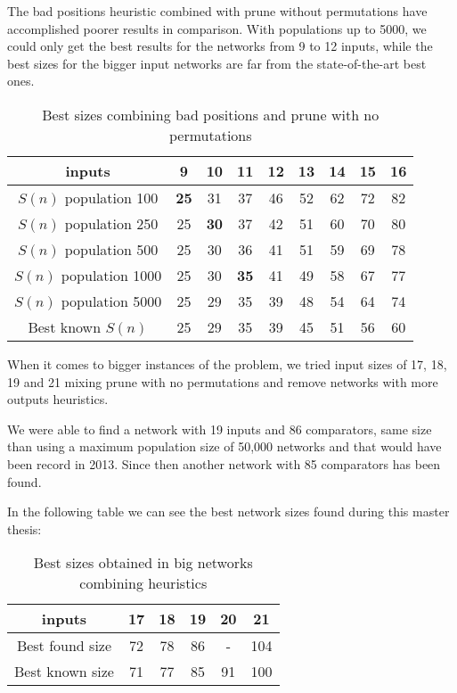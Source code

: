 \documentclass[../main.tex]{subfiles}
\begin{document}
	The bad positions heuristic combined with prune without permutations have accomplished poorer results in comparison. With populations up to 5000, we could only get the best results for the networks from 9 to 12 inputs, while the best sizes for the bigger input networks are far from the state-of-the-art best ones.
	\begin{table}[H]
		\begin{center}
				\begin{tabular}{|c | c c c c c c c c|} 
				\hline
				inputs & 9 & 10 & 11 & 12 & 13 & 14 & 15 & 16  \\ [0.5ex] 
				\hline\hline
				$S(n)$ population 100 & \textbf{25} & 31 & 37 & 46 & 52 & 62 & 72 & 82 \\ [1ex]
				\hline
				$S(n)$ population 250  & 25 & \textbf{30} & 37 & 42 & 51 & 60 & 70 & 80 \\  [1ex] 
				\hline
				$S(n)$ population 500 & 25 & 30 & 36 & 41 & 51 & 59 & 69 & 78 \\  [1ex] 
				\hline
				$S(n)$ population 1000 & 25 & 30 & \textbf{35} & 41 & 49 & 58 & 67 & 77 \\  [1ex] 
				\hline
				$S(n)$ population 5000 & 25 & 29 & 35 & 39 & 48 & 54 & 64 & 74 \\  [1ex] 
				\hline
				Best known $S(n)$ & 25 & 29 & 35 & 39 & 45 & 51 & 56 & 60 \\  [1ex] 
				\hline
			\end{tabular}
		\end{center}
		\caption{Best sizes combining bad positions and prune with no permutations}
	\end{table}
	
	When it comes to bigger instances of the problem, we tried input sizes of 17, 18, 19 and 21 mixing prune with no permutations and remove networks with more outputs heuristics.
	
	We were able to find a network with 19 inputs and 86 comparators, same size than \cite{valsalam:jmlr13} using a maximum population size of 50,000 networks and that would have been record in 2013. Since then another network with 85 comparators has been found.
	
	In the following table we can see the best network sizes found during this master thesis:
	
	\begin{table}[H]
		\begin{center}
			\begin{tabular}{|c | c c c c c|} 
				\hline
				inputs & 17 & 18 & 19 & 20 & 21  \\ [0.5ex] 
				\hline
				Best found size & 72 & 78 & 86 & - & 104 \\ [1ex]
				\hline
				Best known size & 71 & 77 & 85 & 91 & 100 \\ [1ex]
				\hline
			\end{tabular}
		\end{center}	
		\caption{Best sizes obtained in big networks combining heuristics}
		\label{table:sizesHeuristics}
	\end{table}
\end{document}

